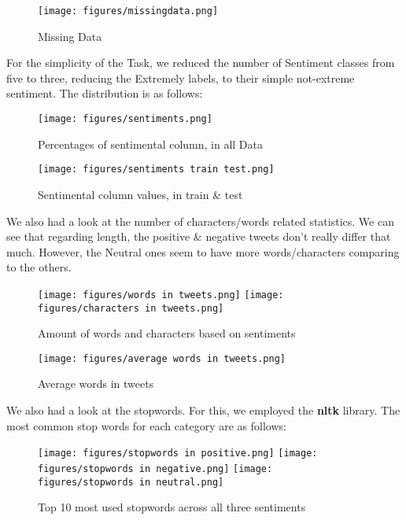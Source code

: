 \documentclass[11pt, a4paper]{article}
\begin{document}
\begin{large}
\begin{figure}[H]
    \centering
    \texttt{[image: figures/missingdata.png]}
    \caption{Missing Data}
    \label{fig:enter-label}
\end{figure}

For the simplicity of the Task, we reduced the number of Sentiment classes from five to three, reducing the Extremely labels, to their simple not-extreme sentiment. The distribution is as follows:

\begin{figure}[H]
    \centering
    \texttt{[image: figures/sentiments.png]}
    \caption{Percentages of sentimental column, in all Data}
    \label{fig:enter-label}
\end{figure}

\begin{figure}[H]
    \centering
    \texttt{[image: figures/sentiments train test.png]}
    \caption{Sentimental column values, in train \& test}
    \label{fig:enter-label}
\end{figure}

We also had a look at the number of characters/words related statistics. We can see that regarding length, the positive \& negative tweets don't really differ that much. However, the Neutral ones seem to have more words/characters comparing to the others.

\begin{figure}[H]
    \centering
    \texttt{[image: figures/words in tweets.png]}
    \texttt{[image: figures/characters in tweets.png]}
    \caption{Amount of words and characters based on sentiments}
    \label{fig:enter-label}
\end{figure}

\begin{figure}[H]
    \centering
    \texttt{[image: figures/average words in tweets.png]}
    \caption{Average words in tweets}
    \label{fig:enter-label}
\end{figure}

We also had a look at the stopwords. For this, we employed the \textbf{nltk} library. The most common stop words for each category are as follows:

\begin{figure}[H]
    \centering
    \texttt{[image: figures/stopwords in positive.png]}
     \texttt{[image: figures/stopwords in negative.png]}
      \texttt{[image: figures/stopwords in neutral.png]}
    \caption{Top 10 most used stopwords across all three sentiments}
    \label{fig:enter-label}
\end{figure}


\end{large}
\end{document}
